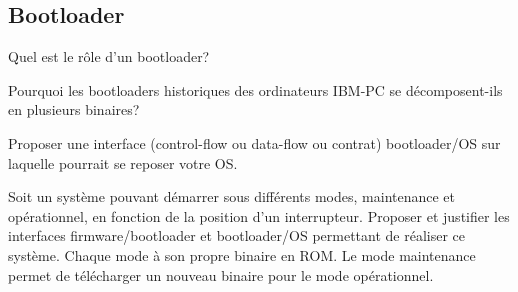 \begin{questions}
\begin{parts}
  \part{Bootloader}
  \begin{subparts}
    \subpart[1] Quel est le rôle d'un bootloader?

    \subpart[1] Pourquoi les bootloaders historiques des ordinateurs IBM-PC se décomposent-ils en plusieurs binaires?

    \subpart[4] Proposer une interface (control-flow ou data-flow ou contrat) bootloader/OS sur laquelle pourrait se reposer votre OS.
  \end{subparts}

  \bonuspart[1]
Soit un système pouvant démarrer sous différents modes, maintenance et opérationnel, en fonction de la position d'un interrupteur. Proposer et justifier les interfaces firmware/bootloader et bootloader/OS permettant de réaliser ce système. Chaque mode à son propre binaire en ROM. Le mode maintenance permet de télécharger un nouveau binaire pour le mode opérationnel.
\end{parts}

%
%

\end{questions}
